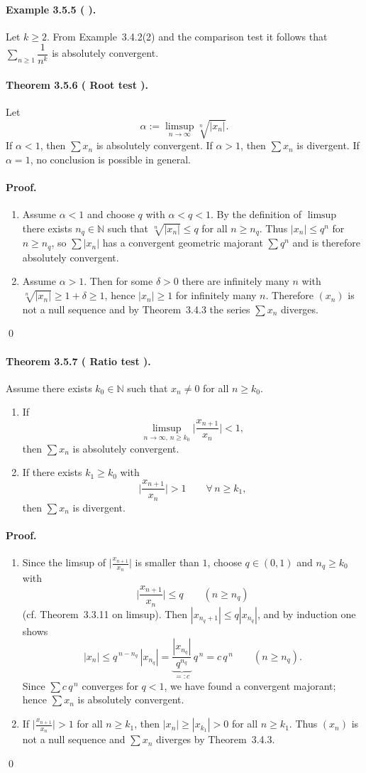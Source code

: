 \documentclass[12pt]{article}
\newcommand{\N}{\mathbb{N}}
\newcommand{\NumberedTheorem}[3]{%
\paragraph*{Theorem #1 ( #2 ).} #3\par}
\newcommand{\NumberedExample}[3]{%
\paragraph*{Example #1 ( #2 ).} #3\par}
\begin{document}
\NumberedExample{3.5.5}{}{Let $k\ge2$. From Example~3.4.2(2) and the comparison test it follows that $\sum_{n\ge1} \dfrac{1}{n^k}$ is absolutely convergent.}

\NumberedTheorem{3.5.6}{Root test}{Let
\[
	\alpha := \limsup_{n\to\infty} \sqrt[n]{|x_n|}.
\]
If $\alpha<1$, then $\sum x_n$ is absolutely convergent. If $\alpha>1$, then $\sum x_n$ is divergent. If $\alpha=1$, no conclusion is possible in general.}
\paragraph{Proof.}
\begin{enumerate}[label={(\arabic*)}, leftmargin=*]
	\item Assume $\alpha<1$ and choose $q$ with $\alpha<q<1$. By the definition of $\limsup$ there exists $n_q\in\N$ such that $\sqrt[n]{|x_n|}\le q$ for all $n\ge n_q$. Thus $|x_n|\le q^n$ for $n\ge n_q$, so $\sum |x_n|$ has a convergent geometric majorant $\sum q^n$ and is therefore absolutely convergent.
	\item Assume $\alpha>1$. Then for some $\delta>0$ there are infinitely many $n$ with $\sqrt[n]{|x_n|}\ge 1+\delta \ge 1$, hence $|x_n|\ge1$ for infinitely many $n$. Therefore $(x_n)$ is not a null sequence and by Theorem~3.4.3 the series $\sum x_n$ diverges.
\end{enumerate}
\qed

\NumberedTheorem{3.5.7}{Ratio test}{Assume there exists $k_0\in\N$ such that $x_n\ne0$ for all $n\ge k_0$.
\begin{enumerate}[label={(\arabic*)}, leftmargin=*]
	\item If
	\[
		\limsup_{n\to\infty,\, n\ge k_0} \Bigg|\frac{x_{n+1}}{x_n}\Bigg| < 1,
	\]
	then $\sum x_n$ is absolutely convergent.
	\item If there exists $k_1\ge k_0$ with
	\[
		\Bigg|\frac{x_{n+1}}{x_n}\Bigg| > 1 \qquad \forall\, n\ge k_1,
	\]
	then $\sum x_n$ is divergent.
\end{enumerate}}
\paragraph{Proof.}
\begin{enumerate}[label={(\arabic*)}, leftmargin=*]
	\item Since the limsup of $\big|\tfrac{x_{n+1}}{x_n}\big|$ is smaller than $1$, choose $q\in(0,1)$ and $n_q\ge k_0$ with
	\[
		\Bigg|\frac{x_{n+1}}{x_n}\Bigg| \le q \qquad (n\ge n_q)
	\]
	(cf. Theorem~3.3.11 on limsup). Then $|x_{n_q+1}|\le q|x_{n_q}|$, and by induction one shows
	\[
		|x_n| \le q^{\,n-n_q}\,|x_{n_q}| = \underbrace{\frac{|x_{n_q}|}{q^{n_q}}}_{=:c}\, q^{\,n} = c\,q^{\,n} \qquad (n\ge n_q).
	\]
	Since $\sum c\,q^{\,n}$ converges for $q<1$, we have found a convergent majorant; hence $\sum x_n$ is absolutely convergent.
	\item If $\big|\tfrac{x_{n+1}}{x_n}\big|>1$ for all $n\ge k_1$, then $|x_n|\ge |x_{k_1}|>0$ for all $n\ge k_1$. Thus $(x_n)$ is not a null sequence and $\sum x_n$ diverges by Theorem~3.4.3.
\end{enumerate}
\qed
\end{document}
